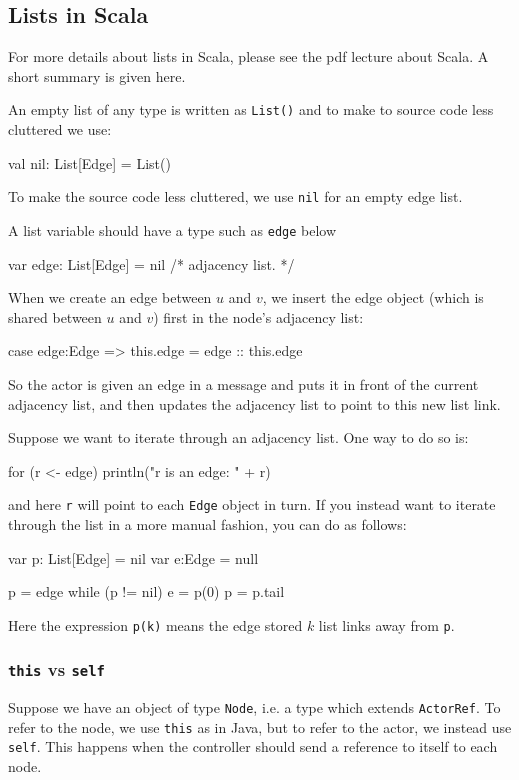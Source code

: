 \documentclass{forsete}
\begin{document}
\subsection*{Lists in Scala}
For more details about lists in Scala, please see the pdf lecture about Scala.
A short summary is given here.

An empty list of any type is written as \verb.List(). and to make to source
code less cluttered we use:
\begin{ccode}
val	nil: List[Edge] = List()
\end{ccode}
To make the source code less cluttered, we use \verb.nil. for an empty edge list.

A list variable should have a type such as \verb.edge. below
\begin{ccode}
var	edge: List[Edge] = nil		/* adjacency list. */
\end{ccode}

When we create an edge between $u$ and $v$, we insert the edge object (which is shared between $u$ and $v$)
first in the node's adjacency list:
\begin{ccode}
case edge:Edge => { this.edge = edge :: this.edge }
\end{ccode}

So the actor is given an edge in a message and puts it in front of the current adjacency list, and
then updates the adjacency list to point to this new list link.

Suppose we want to iterate through an adjacency list. One way to do so is:
\begin{ccode}
for (r <- edge)
	println("r is an edge: " + r)
\end{ccode}
and here \verb.r. will point to each \verb.Edge. object in turn.
If you instead want to iterate through the list in a more manual fashion, you can do as follows:
\begin{ccode}
var	p: List[Edge]	= nil
var	e:Edge		= null

p = edge
while (p != nil) {
	e = p(0)
	p = p.tail
}
\end{ccode}

Here the expression \verb.p(k). means the edge stored $k$ list links away from \verb.p..

\subsubsection*{{\tt this} vs {\tt self}}

Suppose we have an object of type \verb.Node., i.e. a type which extends \verb.ActorRef..
To refer to the node, we use {\tt this} as in Java, but to refer to the actor, 
we instead use {\tt self}. This happens when the controller should send a reference to itself to
each node.
\end{document}
